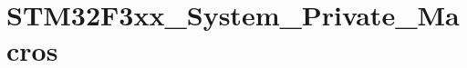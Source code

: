 \hypertarget{group___s_t_m32_f3xx___system___private___macros}{}\section{S\+T\+M32\+F3xx\+\_\+\+System\+\_\+\+Private\+\_\+\+Macros}
\label{group___s_t_m32_f3xx___system___private___macros}
